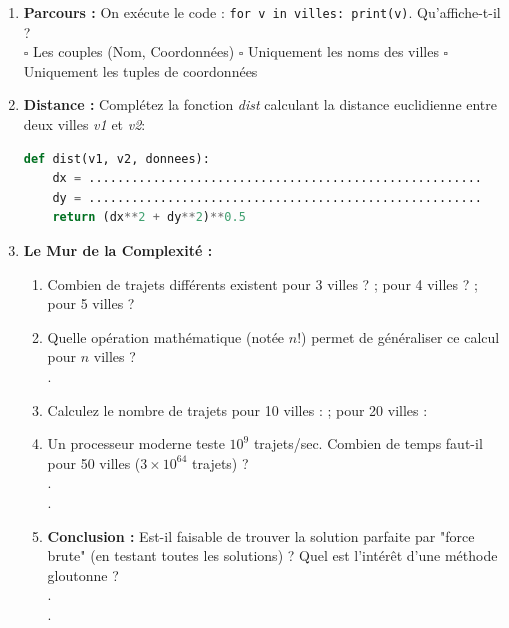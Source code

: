 \begin{Exercise}[title={Mission MayLivraison : Le défi du Drone }]
\begin{enumerate}
    \item  \textbf{Parcours :} On exécute le code : \texttt{for v in villes: print(v)}. Qu'affiche-t-il ?\\
    \hfill $\square$ Les couples (Nom, Coordonnées) \hfill $\square$ Uniquement les noms des villes \hfill $\square$ Uniquement les tuples de coordonnées
    \item  \textbf{Distance :} Complétez la fonction \textit{dist} calculant la distance euclidienne entre deux villes \textit{v1} et \textit{v2}:
    \begin{lstlisting}[style=pythonstyle, language=Python]
def dist(v1, v2, donnees):
    dx = .......................................................
    dy = .......................................................
    return (dx**2 + dy**2)**0.5\end{lstlisting}

    \item  \textbf{Le Mur de la Complexité :}
    \begin{enumerate}
        \item Combien de trajets différents existent pour 3 villes ? \dotfill ; pour 4 villes ? \dotfill ; pour 5 villes ? \dotfill
        \item Quelle opération mathématique (notée $n!$) permet de généraliser ce calcul pour $n$ villes ?\\ 
        .\dotfill
        \item Calculez le nombre de trajets pour 10 villes : \dotfill ; pour 20 villes : \dotfill
        \item Un processeur moderne teste $10^{9}$ trajets/sec. Combien de temps faut-il pour 50 villes ($3 \times 10^{64}$ trajets) ? \\
        .\dotfill\\
        .\dotfill\\
        \item \textbf{Conclusion :} Est-il faisable de trouver la solution parfaite par "force brute" (en testant toutes les solutions) ? Quel est l'intérêt d'une méthode gloutonne ? \\
        .\dotfill\\
        .\dotfill\\
    \end{enumerate}


\end{enumerate}
\end{Exercise}
